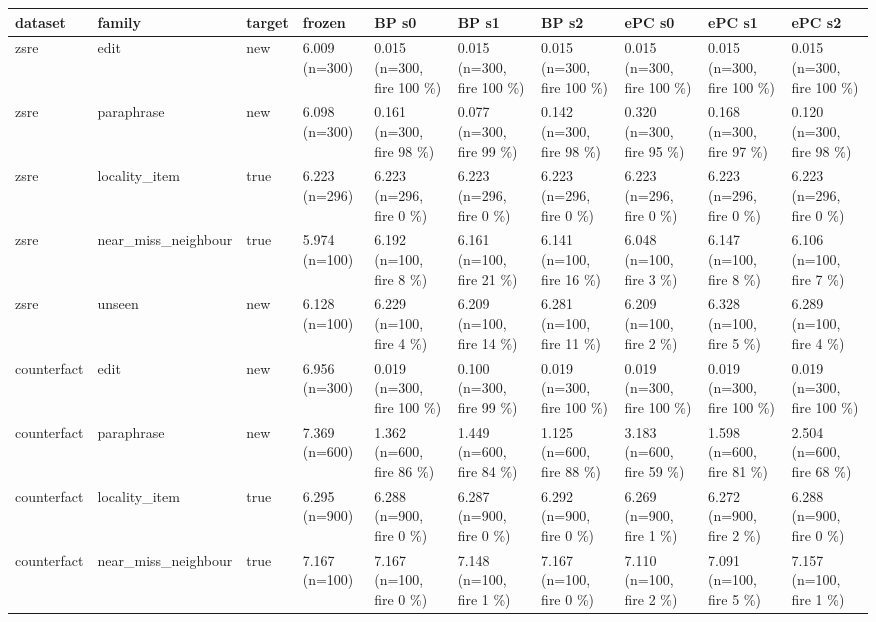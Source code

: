 \documentclass[10pt,a4paper]{article}
\begin{document}
\begin{center}\tiny
\begin{tabularx}{\textwidth}{@{}p{}XXXXXXXXX@{}}
\toprule
dataset & family & target & frozen & BP s0 & BP s1 & BP s2 & ePC s0 & ePC s1 & ePC s2 \\ \midrule
zsre & edit & new & 6.009 (n=300) & 0.015 (n=300, fire 100 \%) & 0.015 (n=300, fire 100 \%) & 0.015 (n=300, fire 100 \%) & 0.015 (n=300, fire 100 \%) & 0.015 (n=300, fire 100 \%) & 0.015 (n=300, fire 100 \%) \\
zsre & paraphrase & new & 6.098 (n=300) & 0.161 (n=300, fire 98 \%) & 0.077 (n=300, fire 99 \%) & 0.142 (n=300, fire 98 \%) & 0.320 (n=300, fire 95 \%) & 0.168 (n=300, fire 97 \%) & 0.120 (n=300, fire 98 \%) \\
zsre & locality\_item & true & 6.223 (n=296) & 6.223 (n=296, fire 0 \%) & 6.223 (n=296, fire 0 \%) & 6.223 (n=296, fire 0 \%) & 6.223 (n=296, fire 0 \%) & 6.223 (n=296, fire 0 \%) & 6.223 (n=296, fire 0 \%) \\
zsre & near\_miss\_neighbour & true & 5.974 (n=100) & 6.192 (n=100, fire 8 \%) & 6.161 (n=100, fire 21 \%) & 6.141 (n=100, fire 16 \%) & 6.048 (n=100, fire 3 \%) & 6.147 (n=100, fire 8 \%) & 6.106 (n=100, fire 7 \%) \\
zsre & unseen & new & 6.128 (n=100) & 6.229 (n=100, fire 4 \%) & 6.209 (n=100, fire 14 \%) & 6.281 (n=100, fire 11 \%) & 6.209 (n=100, fire 2 \%) & 6.328 (n=100, fire 5 \%) & 6.289 (n=100, fire 4 \%) \\
counterfact & edit & new & 6.956 (n=300) & 0.019 (n=300, fire 100 \%) & 0.100 (n=300, fire 99 \%) & 0.019 (n=300, fire 100 \%) & 0.019 (n=300, fire 100 \%) & 0.019 (n=300, fire 100 \%) & 0.019 (n=300, fire 100 \%) \\
counterfact & paraphrase & new & 7.369 (n=600) & 1.362 (n=600, fire 86 \%) & 1.449 (n=600, fire 84 \%) & 1.125 (n=600, fire 88 \%) & 3.183 (n=600, fire 59 \%) & 1.598 (n=600, fire 81 \%) & 2.504 (n=600, fire 68 \%) \\
counterfact & locality\_item & true & 6.295 (n=900) & 6.288 (n=900, fire 0 \%) & 6.287 (n=900, fire 0 \%) & 6.292 (n=900, fire 0 \%) & 6.269 (n=900, fire 1 \%) & 6.272 (n=900, fire 2 \%) & 6.288 (n=900, fire 0 \%) \\
counterfact & near\_miss\_neighbour & true & 7.167 (n=100) & 7.167 (n=100, fire 0 \%) & 7.148 (n=100, fire 1 \%) & 7.167 (n=100, fire 0 \%) & 7.110 (n=100, fire 2 \%) & 7.091 (n=100, fire 5 \%) & 7.157 (n=100, fire 1 \%) \\

\end{tabularx}
\end{center}
\end{document}
